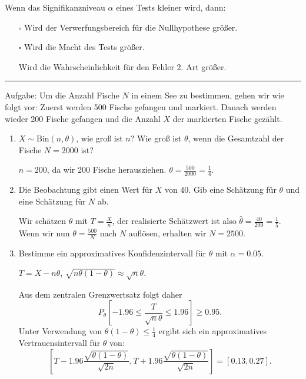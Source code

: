 \begin{tiny}
Wenn das Signifikanzniveau $\alpha$ eines Tests kleiner wird, dann:
\begin{itemize}
    \item[$\square$] Wird der Verwerfungsbereich für die Nullhypothese größer.
    \item[$\square$] Wird die Macht des Tests größer.
    \item[\checkmark] Wird die Wahrscheinlichkeit für den Fehler 2. Art größer.
\end{itemize}
\rule{\linewidth}{0.4pt}
Aufgabe: Um die Anzahl Fische $N$ in einem See zu bestimmen, gehen wir
wie folgt vor: Zuerst werden 500 Fische gefangen und markiert. Danach
werden wieder 200 Fische gefangen und die Anzahl $X$ der markierten
Fische gezählt.

\begin{enumerate}
    \item $X \sim \text{Bin}(n, \theta)$, wie groß ist $n$? Wie groß ist $\theta$, wenn die Gesamtzahl
    der Fische $N = 2000$ ist?
    
    $n = 200$, da wir 200 Fische herausziehen. $\theta = \frac{500}{2000} = \frac{1}{4}$.
    
    \item Die Beobachtung gibt einen Wert für $X$ von 40. Gib eine Schätzung
    für $\theta$ und eine Schätzung für $N$ ab.
    
    Wir schätzen $\theta$ mit $T = \frac{X}{n}$, der realisierte Schätzwert ist also $\hat{\theta} = \frac{40}{200} = \frac{1}{5}$. Wenn wir nun $\theta = \frac{500}{N}$ nach $N$ auflösen, erhalten wir $N = 2500$.
    
    \item Bestimme ein approximatives Konfidenzintervall für $\theta$ mit $\alpha = 0.05$.
    
    $T = X - n\theta$, $\sqrt{n\theta(1-\theta)} \approx \sqrt{n}\theta$.
    
    Aus dem zentralen Grenzwertsatz folgt daher
    \[
    P_{\theta}\left[-1.96 \leq \frac{T}{\sqrt{n}\theta} \leq 1.96\right] \geq 0.95.
    \]
    Unter Verwendung von $\theta(1 - \theta) \leq \frac{1}{4}$ ergibt sich ein approximatives Vertrauensintervall für $\theta$ von:
    \[
    \left[T - 1.96 \frac{\sqrt{\theta(1-\theta)}}{\sqrt{2n}}, T + 1.96 \frac{\sqrt{\theta(1-\theta)}}{\sqrt{2n}}\right] = [0.13, 0.27].
    \]
\end{enumerate}
\end{tiny}
